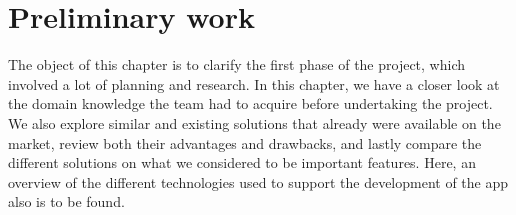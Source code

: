 \chapter{Preliminary work}

\label{sec:prestudy}
The object of this chapter is to clarify the first phase of the project, which involved a lot of planning and research. In this chapter, we have a closer look at the domain knowledge the team had to acquire before undertaking the project. We also explore similar and existing solutions that already were available on the market, review both their advantages and drawbacks, and lastly compare the different solutions on what we considered to be important features. Here, an overview of the different technologies used to support the development of the app also is to be found.


\newpage




